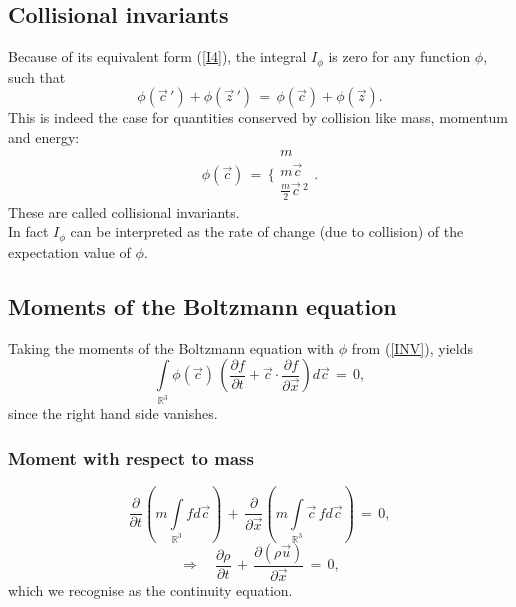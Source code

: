 \subsection{Collisional invariants}

Because of its equivalent form (\ref{I4}), the integral $I_{\phi}$ is zero for any function $\phi$, such that
\begin{equation}
  \phi(\vec c\, ')+ \phi(\vec z\, ')\,=\, \phi(\vec c)+ \phi(\vec z) .\nonumber
\end{equation}
This is indeed the case for quantities conserved by collision like mass, momentum and energy:
\begin{equation}
  \phi(\vec c)\,=\, \Bigg\{ \begin{array}{c}
		m\\
		m \vec c \\
		\frac{m}{2} \vec c\,^2
	\end{array} .\label{INV}
\end{equation}
These are called collisional invariants.\\[1ex]
In fact $I_{\phi}$ can be interpreted as the rate of change (due to collision) of the expectation value of $\phi$.

\subsection{Moments of the Boltzmann equation}

Taking the moments of the Boltzmann equation with $\phi$ from (\ref{INV}), yields
\begin{equation}
  \int \limits_{\mathbb{R}^3} \phi(\vec c) \, \left( \frac{\partial{f}}{\partial{t}} + \vec c \cdot  \frac{\partial{f}}{\partial{\vec x}} \right) d\vec c \, =\, 0,\label{MOM}
\end{equation}
since the right hand side vanishes.

\subsubsection{Moment with respect to mass}

\begin{equation}
  \frac{\partial{}}{\partial{t}} \left( m \int \limits_{\mathbb{R}^3} f d\vec c \right) \, + \, \frac{\partial{}}{\partial{\vec x}}  \left( m \int \limits_{\mathbb{R}^3} \vec c \, f d\vec c \right)  \, =\, 0,\nonumber
\end{equation}
\begin{equation}
  \Rightarrow \quad \frac{\partial{\rho}}{\partial{t}}  \, + \, \frac{\partial{(\rho \vec u)}}{\partial{\vec x}}   \, =\, 0,\label{conti}
\end{equation}
which we recognise as the continuity equation.

